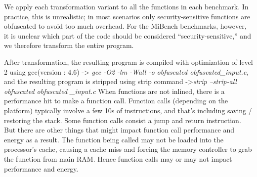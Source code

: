 We apply each transformation variant to all the functions in each benchmark. In practice, this is unrealistic; in most scenarios only security-sensitive functions are obfuscated to avoid too much overhead. For the MiBench benchmarks, however, it is unclear which part of the code should be considered ``security-sensitive,'' and we therefore transform the entire program.


After transformation, the resulting program is compiled with optimization of level 2 using gcc(version : 4.6) -> \emph{gcc -O2 -lm -Wall -o obfuscated obfuscated\_input.c}, and the resulting program is stripped using strip command ->\emph{strip --strip-all obfuscated obfuscated \_input.c}
When functions are not inlined, there is a performance hit to make a function call.
Function calls (depending on the platform) typically involve a few 10s of instructions, and that's including saving / restoring the stack. Some function calls consist a jump and return instruction.
But there are other things that might impact function call performance and energy as a result. The function being called may not be loaded into the processor's cache, causing a cache miss and forcing the memory controller to grab the function from main RAM. Hence function calls may or may not impact performance and energy.

\endinput

\AR{Dr.Collberg: Can you add a short description of these options? Just stating it wouldn't make send to a reviewer. Else, how about having a table for this? Transformation | Options | Description}
\subsubsection{Virtualize}
Virtualize involves transforming a function into an interpretor, whose bytecode language is specialized for the particular function specified. 



\begin{itemize}
\item \textit{--VirtualizeDispatch=[direct,indirect and switch]}.
\item \textit{--VirtualizeSuperOpsRatio=[2 and 0]}.
\item \textit{--VirtualizeMaxMergeLength=[5 and 0]}.
\item \textit{--VirtualizePerformance=[AddressSizeShort, CacheTop and PointerStack]}.
\item \textit{--VirtualizeOperands=[stack and registers]}.
\end{itemize}


